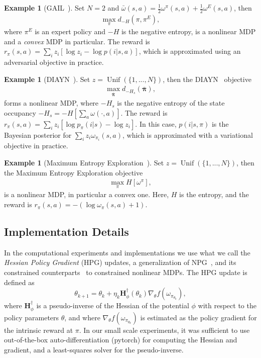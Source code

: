 \documentclass{article}
\theoremstyle{plain}
\theoremstyle{definition}
\newtheorem{example}[theorem]{Example}
\theoremstyle{remark}
\newcommand{\p}{\omega}  %
\begin{document}
\begin{example}[GAIL~\citep{ho2016generative}]
    Set $N=2$ and $\bar\p(s,a)=\frac{1}{2}\p^\pi(s,a) + \frac{1}{2}\p^E(s,a)$, then 
    \begin{align}
        \max_\pi d_{-H}(\pi, \pi^E),
    \end{align}
    where $\pi^E$ is an expert policy and $-H$ is the negative entropy, is a nonlinear MDP and a \emph{convex} MDP in particular.
    The reward is $r_\pi(s,a) = \sum_i z_i [\log z_i - \log p(i|s, a)]$, which is approximated using an adversarial objective in practice.
\end{example}

\begin{example}[DIAYN~\citep{gregor2016variational, eysenbach2018diversity}]
    Set $z=\operatorname{Unif}(\{1,...,N\})$, then the DIAYN~\citep{eysenbach2018diversity} objective
    \begin{align}
        \max_{\boldsymbol{\bar\pi}} d_{-H_s}(\boldsymbol{\bar\pi}),
    \end{align}
    forms a nonlinear MDP, where $-H_s$ is the negative entropy of the state occupancy $-H_s = -H[\sum_a\omega(\cdot,a)]$.
    The reward is $r_\pi(s,a) = \sum_i z_i [\log p_\pi(i|s) - \log z_i]$. In this case, $p(i|s,\pi)$ is the Bayesian posterior for $\sum_i z_i \omega_{\pi_i}(s,a)$, which is approximated with a variational objective in practice.
\end{example}

\begin{example}[Maximum Entropy Exploration~\citep{hazan2019provably}]
    Set $z=\operatorname{Unif}(\{1,...,N\})$, then the Maximum Entropy Exploration objective
    \begin{align}
        \max_\pi H[\omega^\pi],
    \end{align}
    is a nonlinear MDP, in particular a convex one.
    Here, $H$ is the entropy, and the reward is $r_\pi(s,a) = -(\log \omega_\pi(s,a) + 1)$.
\end{example}

\subsection{Implementation Details}\label{app:implementation-details}
In the computational experiments and implementations we use what we call the \emph{Hessian Policy Gradient} (HPG) updates, a generalization of NPG~\citep{kakade2001natural}, and its constrained counterparts~\citep{milosevic2024embedding} to constrained nonlinear MDPs. 
The HPG update is defined as
\begin{equation}\label{eq:hpg}
\theta_{k+1} = \theta_k + \eta_k \mathbf{H}_\phi^\dagger(\theta_k) \nabla_\theta f(\omega_{\pi_{\theta_k}}),
\end{equation}
where $\mathbf{H}_\phi^\dagger$ is a pseudo-inverse of the Hessian of the potential $\phi$ with respect to the policy parameters $\theta$, and where $\nabla_\theta f(\omega_{\pi_{\theta_k}})$ is estimated as the policy gradient for the intrinsic reward at $\pi$. 
In our small scale experiments, it was sufficient to use out-of-the-box auto-differentiation (pytorch) for computing the Hessian and gradient, and a least-squares solver for the pseudo-inverse.
\end{document}
